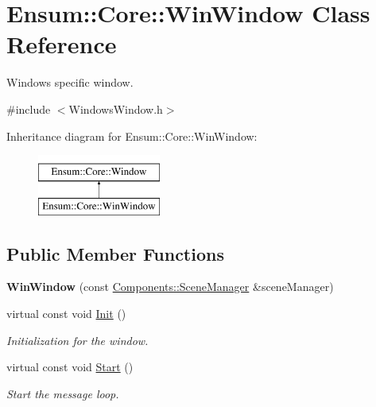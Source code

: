 \hypertarget{class_ensum_1_1_core_1_1_win_window}{}\section{Ensum\+:\+:Core\+:\+:Win\+Window Class Reference}
\label{class_ensum_1_1_core_1_1_win_window}


Windows specific window.  




{\ttfamily \#include $<$Windows\+Window.\+h$>$}

Inheritance diagram for Ensum\+:\+:Core\+:\+:Win\+Window\+:\begin{figure}[H]
\begin{center}
\leavevmode
\includegraphics[height=2.000000cm]{class_ensum_1_1_core_1_1_win_window}
\end{center}
\end{figure}
\subsection*{Public Member Functions}
\begin{DoxyCompactItemize}
\item 
{\bfseries Win\+Window} (const \hyperlink{class_ensum_1_1_components_1_1_scene_manager}{Components\+::\+Scene\+Manager} \&scene\+Manager)\hypertarget{class_ensum_1_1_core_1_1_win_window_aa635032216ae921892d67bfc09124d1d}{}\label{class_ensum_1_1_core_1_1_win_window_aa635032216ae921892d67bfc09124d1d}

\item 
virtual const void \hyperlink{class_ensum_1_1_core_1_1_win_window_afb59ce364f98918b2b17653cbfc39ead}{Init} ()\hypertarget{class_ensum_1_1_core_1_1_win_window_afb59ce364f98918b2b17653cbfc39ead}{}\label{class_ensum_1_1_core_1_1_win_window_afb59ce364f98918b2b17653cbfc39ead}

\begin{DoxyCompactList}\small\item\em Initialization for the window. \end{DoxyCompactList}\item 
virtual const void \hyperlink{class_ensum_1_1_core_1_1_win_window_a1c316902d186c3d685210237e3438745}{Start} ()\hypertarget{class_ensum_1_1_core_1_1_win_window_a1c316902d186c3d685210237e3438745}{}\label{class_ensum_1_1_core_1_1_win_window_a1c316902d186c3d685210237e3438745}

\begin{DoxyCompactList}\small\item\em Start the message loop. \end{DoxyCompactList}\end{DoxyCompactItemize}
